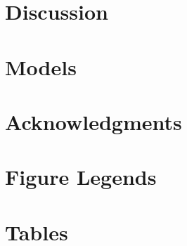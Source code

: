 \section*{Discussion}


\section*{Models}


%

\section*{Acknowledgments}




\section*{Figure Legends}


\FloatBarrier

\section*{Tables}






